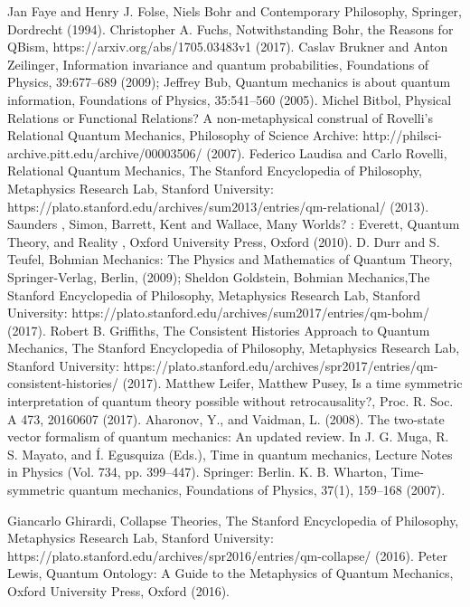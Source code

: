 \documentclass[onecolumn,preprintnumbers,amsmath,amssymbn,reprint,nofootinbib,superscriptaddress]{revtex4}    %
\begin{document}
\begin{thebibliography}{}
Jan Faye and Henry J. Folse,
Niels Bohr and Contemporary Philosophy, Springer, Dordrecht (1994).
Christopher A. Fuchs, Notwithstanding Bohr, the Reasons for QBism, https://arxiv.org/abs/1705.03483v1 (2017).
 Caslav Brukner and Anton Zeilinger, Information invariance and quantum probabilities,
Foundations of Physics, 39:677–689 (2009);
 Jeffrey Bub, Quantum mechanics is about quantum information,
Foundations of Physics, 35:541–560 (2005).
Michel Bitbol, Physical Relations or Functional Relations? A non-metaphysical construal of Rovelli's Relational Quantum Mechanics, Philosophy of Science Archive: http://philsci-archive.pitt.edu/archive/00003506/ (2007). 
 Federico Laudisa and Carlo Rovelli, Relational Quantum Mechanics, The Stanford Encyclopedia of Philosophy, Metaphysics Research Lab, Stanford University: https://plato.stanford.edu/archives/sum2013/entries/qm-relational/ (2013).
Saunders , Simon, Barrett, Kent and Wallace,  Many Worlds? : Everett, Quantum Theory, and Reality , Oxford University Press, Oxford (2010).
 D. Durr and S. Teufel,
Bohmian Mechanics: The Physics and Mathematics of Quantum Theory, Springer-Verlag, Berlin, (2009); Sheldon Goldstein, Bohmian Mechanics,The Stanford Encyclopedia of Philosophy, Metaphysics Research Lab, Stanford University: https://plato.stanford.edu/archives/sum2017/entries/qm-bohm/ (2017).
Robert B. Griffiths, The Consistent Histories Approach to Quantum Mechanics, The Stanford Encyclopedia of Philosophy, Metaphysics Research Lab, Stanford University: https://plato.stanford.edu/archives/spr2017/entries/qm-consistent-histories/ (2017).
Matthew Leifer, Matthew Pusey, Is a time symmetric interpretation of quantum theory possible without retrocausality?, Proc. R. Soc. A 473, 20160607 (2017).
 Aharonov, Y., and Vaidman, L. (2008). The two-state vector formalism of quantum mechanics: An updated review. In J. G. Muga, R. S. Mayato, and \'I. Egusquiza (Eds.), Time in quantum mechanics, Lecture Notes in Physics (Vol. 734, pp. 399–447). Springer: Berlin.
K. B. Wharton, Time-symmetric quantum mechanics, Foundations of Physics, 37(1), 159–168 (2007). 



 Giancarlo Ghirardi, Collapse Theories, The Stanford Encyclopedia of Philosophy, Metaphysics Research Lab, Stanford University: https://plato.stanford.edu/archives/spr2016/entries/qm-collapse/ (2016).
Peter Lewis, Quantum Ontology:  A Guide to the Metaphysics of Quantum Mechanics, Oxford University Press, Oxford (2016).




\end{thebibliography}
\end{document}
